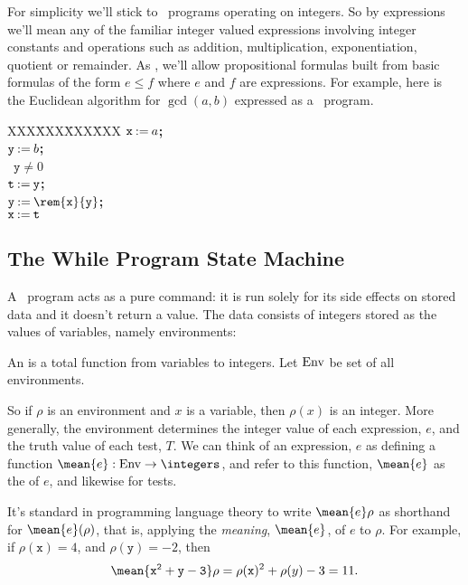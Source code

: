 For simplicity we'll stick to \while\ programs operating on integers.  So by
expressions we'll mean any of the familiar integer valued
expressions involving integer constants and operations such as addition,
multiplication, exponentiation, quotient or remainder.  As ,
we'll allow propositional formulas built from basic formulas of the form
$e \leq f$ where $e$ and $f$ are expressions.  For example, here is the
Euclidean algorithm for $\gcd(a,b)$ expressed as a \while\ program.
\begin{tabbing}
XXX\=XXX\=XXX\=XXX\kill
$\mathtt{x} \mathbin{\mathtt{:=}} a$\textbf{;} \\
$\mathtt{y} \mathbin{\mathtt{:=}} b$\textbf{;} \\
\while\ $\mathtt{y} \neq 0$ \docomm\\
   \> $\mathtt{t} \mathbin{\mathtt{:=}} \mathtt{y}$\textbf{;}\\
   \> $\mathtt{y} \assigned \rem{\mathtt{x}}{\mathtt{y}}$\textbf{;}\\
   \> $\mathtt{x} \mathbin{\mathtt{:=}} \mathtt{t}$
\odcomm\\
\end{tabbing}

\subsection{The \textbf{While}  Program State Machine}

A \while\ program acts as a pure command: it is run solely for its
side effects on stored data and it doesn't return a value.  The data
consists of integers stored as the values of variables, namely
environments:
\begin{definition}
An  is a total function from variables to integers.
Let $\text{Env}$ be set of all environments.
\end{definition}
So if $\rho$ is an environment and $x$ is a variable, then $\rho(x)$ is an
integer.  More generally, the environment determines the integer value of
each expression, $e$, and the truth value of each test, $T$.  We can think
of an expression, $e$ as defining a function $\mean{e}:\Env \to
\integers$, and refer to this function, $\mean{e}$ as the 
of $e$, and likewise for tests.

It's standard in programming language theory to write $\mean{e}\rho$
as shorthand for $\mean{e}(\rho)$, that is, applying
the \emph{meaning}, $\mean{e}$, of $e$ to $\rho$.  For example, if
$\rho(\mathtt{x}) =4$, and $\rho(\mathtt{y}) =-2$, then
\begin{equation}\label{x2y311}
\mean{\mathtt{x^2+y -3}}\rho = \rho(\mathtt{x})^2 + \rho(y) -3 = 11.
\end{equation}

